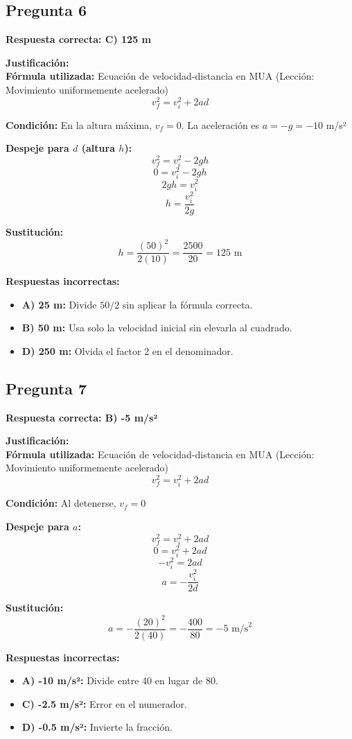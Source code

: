 \begin{respuestabox}
\subsection{Pregunta 6}
\textcolor{verdecorrecto}{\textbf{Respuesta correcta: C) 125 m}}

\textbf{Justificación:}\\
\textbf{Fórmula utilizada:} Ecuación de velocidad-distancia en MUA (Lección: Movimiento uniformemente acelerado)
$$v_f^2 = v_i^2 + 2ad$$

\textbf{Condición:} En la altura máxima, $v_f = 0$. La aceleración es $a = -g = -10$ m/s²

\textbf{Despeje para $d$ (altura $h$):}
$$v_f^2 = v_i^2 - 2gh$$
$$0 = v_i^2 - 2gh$$
$$2gh = v_i^2$$
$$h = \frac{v_i^2}{2g}$$

\textbf{Sustitución:}
$$h = \frac{(50)^2}{2(10)} = \frac{2500}{20} = 125 \text{ m}$$

\textbf{Respuestas incorrectas:}
\begin{itemize}
    \item \textbf{A) 25 m:} Divide $50/2$ sin aplicar la fórmula correcta.
    \item \textbf{B) 50 m:} Usa solo la velocidad inicial sin elevarla al cuadrado.
    \item \textbf{D) 250 m:} Olvida el factor 2 en el denominador.
\end{itemize}
\end{respuestabox}

\newpage

\begin{respuestabox}
\subsection{Pregunta 7}
\textcolor{verdecorrecto}{\textbf{Respuesta correcta: B) -5 m/s²}}

\textbf{Justificación:}\\
\textbf{Fórmula utilizada:} Ecuación de velocidad-distancia en MUA (Lección: Movimiento uniformemente acelerado)
$$v_f^2 = v_i^2 + 2ad$$

\textbf{Condición:} Al detenerse, $v_f = 0$

\textbf{Despeje para $a$:}
$$v_f^2 = v_i^2 + 2ad$$
$$0 = v_i^2 + 2ad$$
$$-v_i^2 = 2ad$$
$$a = -\frac{v_i^2}{2d}$$

\textbf{Sustitución:}
$$a = -\frac{(20)^2}{2(40)} = -\frac{400}{80} = -5 \text{ m/s}^2$$

\textbf{Respuestas incorrectas:}
\begin{itemize}
    \item \textbf{A) -10 m/s²:} Divide entre 40 en lugar de 80.
    \item \textbf{C) -2.5 m/s²:} Error en el numerador.
    \item \textbf{D) -0.5 m/s²:} Invierte la fracción.
\end{itemize}
\end{respuestabox}

